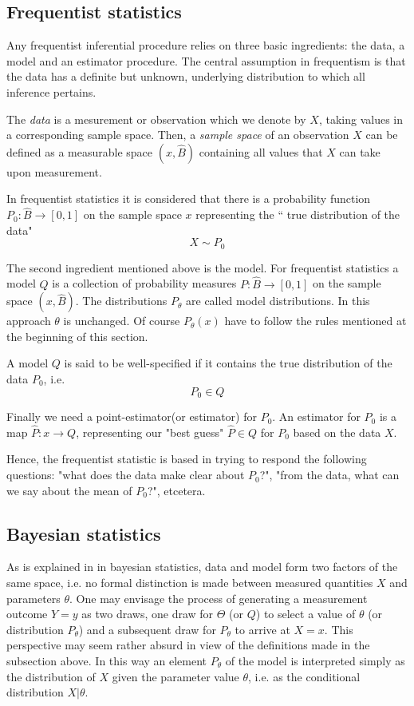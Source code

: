 \documentclass[onecolumn,           %
               showpacs,            %
               preprintnumbers,     %
               aps,                 %
               prl,          	    %
               letterpaper,             %
               superscriptaddress,      %
               nofootinbib,         %
               tightenlines,        %
               floats,floatfix      %
               ,usenatbib,
               ]{revtex4-1}
\begin{document}
\subsection{Frequentist statistics}

Any frequentist inferential procedure relies on three basic ingredients: the data, a model and an estimator procedure. The central assumption in frequentism is that the data has a definite but unknown, underlying distribution to which all inference pertains.

The \textit{data} is a mesurement or observation which we denote by $X$, taking values in a corresponding sample space. Then, a \textit{sample space} of an observation $X$ can be defined as a measurable space $(x,\hat B)$ containing all values that $X$ can take upon measurement.

In frequentist statistics it is considered that there is a probability function $P_0:\hat B\rightarrow [0,1]$ on the sample space $x$ representing the `` true distribution of the data"
\[X\sim P_0\]

The second ingredient mentioned above is the model. For frequentist statistics a model $Q$ is a collection of probability measures $P:\hat B\rightarrow[0,1]$ on the sample space $(x,\hat B)$. The distributions $P_\theta$ are called model distributions. In this approach $\theta$ is unchanged.  Of course $P_\theta(x)$ have to follow the rules mentioned at the beginning of this section.

A model $Q$ is said to be well-specified if it contains the true distribution of the data $P_0$, i.e.
\[P_0\in Q\]

Finally we need a point-estimator(or estimator) for $P_0$. An estimator for $P_0$ is a map $\hat P:x\rightarrow Q$, representing our "best guess" $\hat P\in Q$ for $P_0$ based on the data $X$.

Hence, the frequentist statistic is based in trying to respond the following questions: "what does the data make clear about $P_0$?", "from the data, what can we say about the mean of $P_0$?",  etcetera.

\subsection{Bayesian statistics}

As is explained in \cite{bayeslecture} in bayesian statistics, data and model form two factors of the same space, i.e. no formal distinction is made between measured quantities $X$ and parameters $\theta$. One may envisage the process of generating a measurement outcome $Y=y$ as two draws, one draw for $\Theta$ (or $Q$)
to select a value of $\theta$ (or distribution $P_\theta$) and a subsequent draw for $P_\theta$ to arrive at $X=x$. This perspective may seem rather absurd in view of the definitions made in the subsection above. In this way an element $P_\theta$ of the model is interpreted simply as the distribution of $X$ given the parameter value $\theta$, i.e. as the conditional distribution $X|\theta$.
\end{document}

